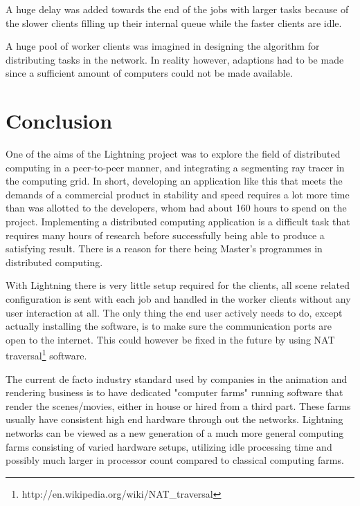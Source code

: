 A huge delay was added towards the end of the jobs with larger tasks because
of the slower clients filling up their internal queue while the faster clients are idle.

A huge pool of worker clients was imagined in designing the algorithm for
distributing tasks in the network. In reality however, adaptions had to be made
since a sufficient amount of computers could not be made available.


\section{Conclusion}
One of the aims of the Lightning project was to explore the field of distributed
computing in a peer-to-peer manner, and integrating a segmenting ray tracer in
the computing grid. In short, developing an application like this that meets 
the demands of a commercial product in stability and speed requires a lot more 
time than was allotted to the developers, whom had about 160 hours to spend on
the project. Implementing a distributed computing application is a difficult
task that requires many hours of research before successfully being able to
produce a satisfying result. There is a reason for there being Master's
programmes in distributed computing.


With Lightning there is very little setup required for the clients,
all scene related configuration is sent with each job and handled in the
worker clients without any user interaction at all. The only thing the end
user actively needs to do, except actually installing the software, is to
make sure the communication ports are open to the internet. This could however
be fixed in the future by using NAT traversal\footnote{http://en.wikipedia.org/wiki/NAT\_traversal} software.

The current de facto industry standard used by companies in the animation and
rendering business is to have dedicated "computer farms" running software
that render the scenes/movies, either in house or hired from a third part.
These farms usually have  consistent high end hardware through out the
networks. Lightning networks can be viewed as a new generation of a much
more general computing farms consisting of varied hardware setups, utilizing
idle processing time and possibly much larger in processor count compared to
classical computing farms.

